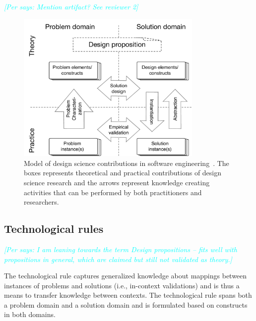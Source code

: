 \documentclass[graybox]{svmult}
\newcommand{\per}[1]{\textcolor{cyan}{{\it [Per says: #1]}}}
\newcommand{\per}[1]{}
\begin{document}
\per{Mention artifact? See reviewer 2}

\begin{figure}
  \includegraphics[width=0.8\textwidth]{Figures/DS_model.pdf}
\caption{Model of design science contributions in software engineering~\cite{Engstrom19arxiv}. The boxes represents theoretical and practical contributions of design science research and the arrows represent knowledge creating activities that can be performed by both practitioners and researchers.}
\label{fig:DS_model}       %
\end{figure}



\subsection{Technological rules}
\label{sec:technologicalrules}

\per{I am leaning towards the term Design propositions -- fits well with propositions in general, which are claimed but still not validated as theory.}

The technological rule captures generalized knowledge about mappings between instances of problems and solutions (i.e., in-context validations) and is thus a means to transfer knowledge between contexts. The technological rule spans both a problem domain and a solution domain and is formulated based on constructs in both domains. 
\end{document}
